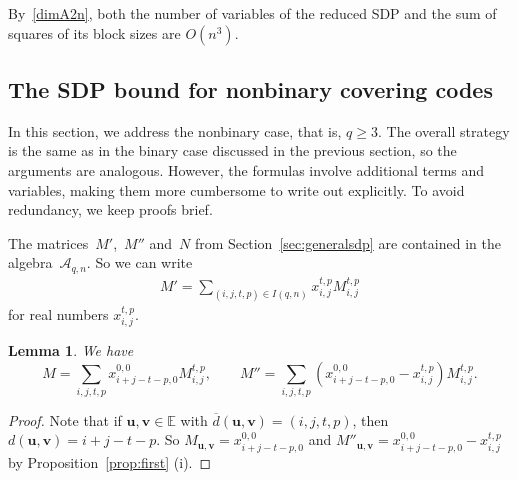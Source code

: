 \documentclass[10pt,a4paper]{article}
\newcommand{\E}{\mathbb{E}}
\newtheorem{lemma}[theorem]{Lemma}
\theoremstyle{definition}
\newcommand{\uu}{\mathbf{u}}
\newcommand{\vv}{\mathbf{v}}
\begin{document}
By~\eqref{dimA2n}, both the number of variables of the reduced SDP and the sum of squares of its block sizes are $O(n^3)$. 

\subsection{The SDP bound for nonbinary covering codes\label{sec:nonbinary}}

In this section, we address the nonbinary case, that is, $q \geq 3$. The overall strategy is the same as in the binary case discussed in the previous section, so the arguments are analogous. However, the formulas involve additional terms and variables, making them more cumbersome to write out explicitly. To avoid redundancy, we keep proofs brief.


The matrices~$M'$,~$M''$ and~$N$ from Section~\ref{sec:generalsdp} are contained in the algebra~$\mathcal{A}_{q,n}$. So we can write
\begin{align}\label{eq:Mprimeqary}
M'= \sum_{(i,j,t,p) \in I(q,n)} x_{i,j}^{t,p} M_{i,j}^{t,p} 
\end{align}
for real numbers $x_{i,j}^{t,p}$.
\begin{lemma}\label{lem:matricesqary}
We have 
\[
M=\sum_{i,j,t,p} x_{i+j-t-p,0}^{0,0} M_{i,j}^{t,p},\qquad M'' =  \sum_{i,j,t,p} (x_{i+j-t-p,0}^{0,0} - x_{i,j}^{t,p}) M_{i,j}^{t,p}.
\]
\end{lemma}
\begin{proof}
Note that if $\uu,\vv\in \E$ with $\overline{d}(\uu,\vv)=(i,j,t,p)$, then $d(\uu,\vv)=i+j-t-p$. So $M_{\uu,\vv} = x_{i+j-t-p,0}^{0,0}$ and $M''_{\uu,\vv} = x_{i+j-t-p,0}^{0,0} - x_{i,j}^{t,p}$ by Proposition~\ref{prop:first} (i). 
\end{proof}
\end{document}
